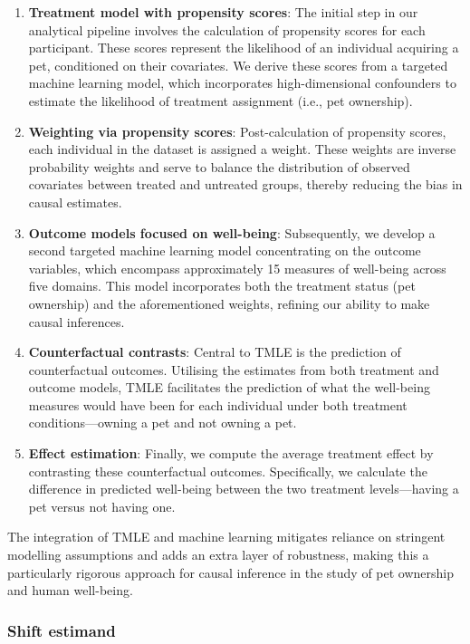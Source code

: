 \documentclass[
  singlecolumn,
  9pt]{article}
\begin{document}
\begin{enumerate}
\def\labelenumi{\arabic{enumi}.}
\item
  \textbf{Treatment model with propensity scores}: The initial step in
  our analytical pipeline involves the calculation of propensity scores
  for each participant. These scores represent the likelihood of an
  individual acquiring a pet, conditioned on their covariates. We derive
  these scores from a targeted machine learning model, which
  incorporates high-dimensional confounders to estimate the likelihood
  of treatment assignment (i.e., pet ownership).
\item
  \textbf{Weighting via propensity scores}: Post-calculation of
  propensity scores, each individual in the dataset is assigned a
  weight. These weights are inverse probability weights and serve to
  balance the distribution of observed covariates between treated and
  untreated groups, thereby reducing the bias in causal estimates.
\item
  \textbf{Outcome models focused on well-being}: Subsequently, we
  develop a second targeted machine learning model concentrating on the
  outcome variables, which encompass approximately 15 measures of
  well-being across five domains. This model incorporates both the
  treatment status (pet ownership) and the aforementioned weights,
  refining our ability to make causal inferences.
\item
  \textbf{Counterfactual contrasts}: Central to TMLE is the prediction
  of counterfactual outcomes. Utilising the estimates from both
  treatment and outcome models, TMLE facilitates the prediction of what
  the well-being measures would have been for each individual under both
  treatment conditions---owning a pet and not owning a pet.
\item
  \textbf{Effect estimation}: Finally, we compute the average treatment
  effect by contrasting these counterfactual outcomes. Specifically, we
  calculate the difference in predicted well-being between the two
  treatment levels---having a pet versus not having one.
\end{enumerate}

The integration of TMLE and machine learning mitigates reliance on
stringent modelling assumptions and adds an extra layer of robustness,
making this a particularly rigorous approach for causal inference in the
study of pet ownership and human well-being.

\subsubsection{Shift estimand}\label{shift-estimand}
\end{document}
